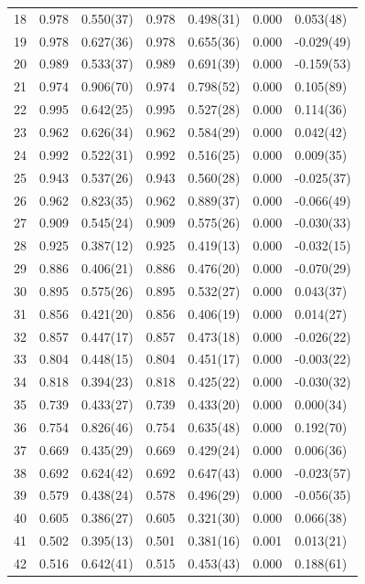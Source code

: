 \documentclass[aps, prc, tightenlines,superscriptaddress, letterpaper, amsmath, amssymb, preprintnumbers, floatfix, longbibliography, nofootinbib]{revtex4-2}
\begin{document}
\begin{table}[!htb]
{\begin{tabularx}{\textwidth}{| c || Y | Y | Y | Y | Y | Y |}
18	&	0.978	&	0.550(37)	&	0.978	&	0.498(31)	&	0.000	&	0.053(48)	\\
19	&	0.978	&	0.627(36)	&	0.978	&	0.655(36)	&	0.000	&	-0.029(49)	\\
20	&	0.989	&	0.533(37)	&	0.989	&	0.691(39)	&	0.000	&	-0.159(53)	\\
21	&	0.974	&	0.906(70)	&	0.974	&	0.798(52)	&	0.000	&	0.105(89)	\\
22	&	0.995	&	0.642(25)	&	0.995	&	0.527(28)	&	0.000	&	0.114(36)	\\
23	&	0.962	&	0.626(34)	&	0.962	&	0.584(29)	&	0.000	&	0.042(42)	\\
24	&	0.992	&	0.522(31)	&	0.992	&	0.516(25)	&	0.000	&	0.009(35)	\\
25	&	0.943	&	0.537(26)	&	0.943	&	0.560(28)	&	0.000	&	-0.025(37)	\\
26	&	0.962	&	0.823(35)	&	0.962	&	0.889(37)	&	0.000	&	-0.066(49)	\\
27	&	0.909	&	0.545(24)	&	0.909	&	0.575(26)	&	0.000	&	-0.030(33)	\\
28	&	0.925	&	0.387(12)	&	0.925	&	0.419(13)	&	0.000	&	-0.032(15)	\\
29	&	0.886	&	0.406(21)	&	0.886	&	0.476(20)	&	0.000	&	-0.070(29)	\\
30	&	0.895	&	0.575(26)	&	0.895	&	0.532(27)	&	0.000	&	0.043(37)	\\
31	&	0.856	&	0.421(20)	&	0.856	&	0.406(19)	&	0.000	&	0.014(27)	\\
32	&	0.857	&	0.447(17)	&	0.857	&	0.473(18)	&	0.000	&	-0.026(22)	\\
33	&	0.804	&	0.448(15)	&	0.804	&	0.451(17)	&	0.000	&	-0.003(22)	\\
34	&	0.818	&	0.394(23)	&	0.818	&	0.425(22)	&	0.000	&	-0.030(32)	\\
35	&	0.739	&	0.433(27)	&	0.739	&	0.433(20)	&	0.000	&	0.000(34)	\\
36	&	0.754	&	0.826(46)	&	0.754	&	0.635(48)	&	0.000	&	0.192(70)	\\
37	&	0.669	&	0.435(29)	&	0.669	&	0.429(24)	&	0.000	&	0.006(36)	\\
38	&	0.692	&	0.624(42)	&	0.692	&	0.647(43)	&	0.000	&	-0.023(57)	\\
39	&	0.579	&	0.438(24)	&	0.578	&	0.496(29)	&	0.000	&	-0.056(35)	\\
40	&	0.605	&	0.386(27)	&	0.605	&	0.321(30)	&	0.000	&	0.066(38)	\\
41	&	0.502	&	0.395(13)	&	0.501	&	0.381(16)	&	0.001	&	0.013(21)	\\
42	&	0.516	&	0.642(41)	&	0.515	&	0.453(43)	&	0.000	&	0.188(61)	\\

\end{tabularx}}
\end{table}
\end{document}
